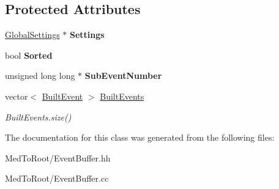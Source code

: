 \subsection*{Protected Attributes}
\begin{DoxyCompactItemize}
\item 
\mbox{\label{class_event_buffer_a0c7ee1b008d8ff909977d6c38c010923}} 
\hyperlink{class_global_settings}{Global\+Settings} $\ast$ {\bfseries Settings}
\item 
\mbox{\label{class_event_buffer_ad495f17af4b84135789a21ed0109a239}} 
bool {\bfseries Sorted}
\item 
\mbox{\label{class_event_buffer_aeef0e2bbc3fc656ea04be240e044d71d}} 
unsigned long long $\ast$ {\bfseries Sub\+Event\+Number}
\item 
\mbox{\label{class_event_buffer_a18101f4a449fbf92fa3c946b0924fb10}} 
vector$<$ \hyperlink{class_built_event}{Built\+Event} $>$ \hyperlink{class_event_buffer_a18101f4a449fbf92fa3c946b0924fb10}{Built\+Events}
\begin{DoxyCompactList}\small\item\em Built\+Events.\+size() \end{DoxyCompactList}\end{DoxyCompactItemize}


The documentation for this class was generated from the following files\+:\begin{DoxyCompactItemize}
\item 
Med\+To\+Root/Event\+Buffer.\+hh\item 
Med\+To\+Root/Event\+Buffer.\+cc\end{DoxyCompactItemize}
